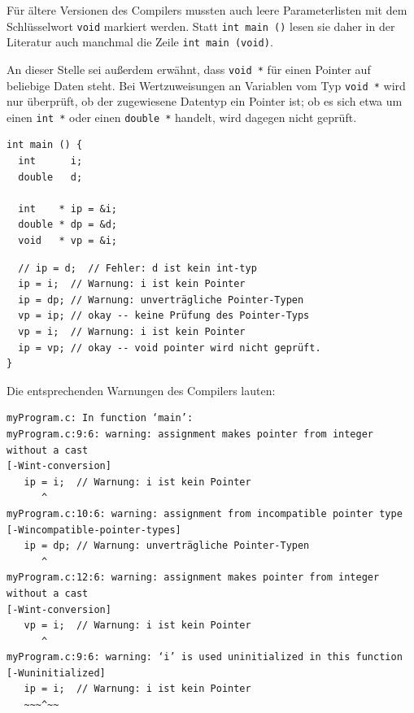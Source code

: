 Für ältere Versionen des Compilers mussten auch leere Parameterlisten mit dem Schlüsselwort \texttt{void} markiert werden. Statt \texttt{int main ()} lesen sie daher in der Literatur auch manchmal die Zeile \texttt{int main (void)}.

An dieser Stelle sei außerdem erwähnt, dass \texttt{void *} für einen Pointer auf beliebige Daten steht. Bei Wertzuweisungen an Variablen vom Typ \texttt{void *} wird nur überprüft, ob der zugewiesene Datentyp ein Pointer ist; ob es sich etwa um einen \texttt{int *} oder einen \texttt{double *} handelt, wird dagegen nicht geprüft.

\begin{codebox}
\begin{verbatim}
int main () {
  int      i;
  double   d;

  int    * ip = &i;
  double * dp = &d;
  void   * vp = &i;
\end{verbatim}
\end{codebox}

\begin{codebox}[]
\begin{verbatim}
  // ip = d;  // Fehler: d ist kein int-typ
  ip = i;  // Warnung: i ist kein Pointer
  ip = dp; // Warnung: unverträgliche Pointer-Typen
  vp = ip; // okay -- keine Prüfung des Pointer-Typs
  vp = i;  // Warnung: i ist kein Pointer
  ip = vp; // okay -- void pointer wird nicht geprüft.
}
\end{verbatim}
\end{codebox}

Die entsprechenden Warnungen des Compilers lauten:
\begin{cmdbox}
\begin{verbatim}
myProgram.c: In function ‘main’:
myProgram.c:9:6: warning: assignment makes pointer from integer without a cast
[-Wint-conversion]
   ip = i;  // Warnung: i ist kein Pointer
      ^
myProgram.c:10:6: warning: assignment from incompatible pointer type
[-Wincompatible-pointer-types]
   ip = dp; // Warnung: unverträgliche Pointer-Typen
      ^
myProgram.c:12:6: warning: assignment makes pointer from integer without a cast
[-Wint-conversion]
   vp = i;  // Warnung: i ist kein Pointer
      ^
myProgram.c:9:6: warning: ‘i’ is used uninitialized in this function
[-Wuninitialized]
   ip = i;  // Warnung: i ist kein Pointer
   ~~~^~~
\end{verbatim}
\end{cmdbox}


